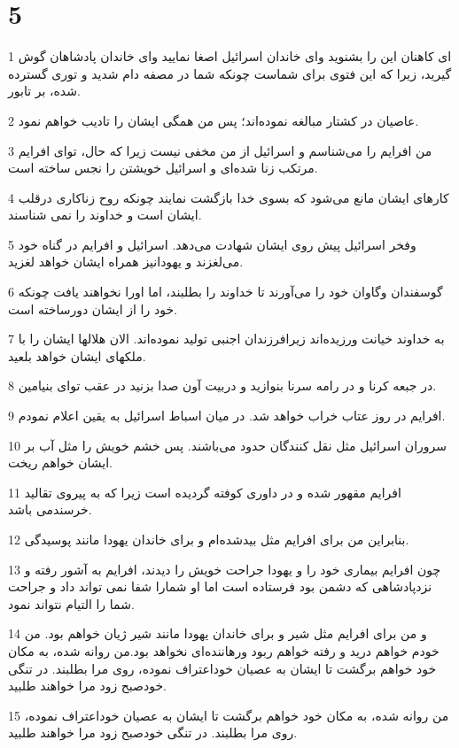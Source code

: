 \chapter{5}

\par 1 ای کاهنان این را بشنوید و‌ای خاندان اسرائیل اصغا نمایید و‌ای خاندان پادشاهان گوش گیرید، زیرا که این فتوی برای شماست چونکه شما در مصفه دام شدید و توری گسترده شده، بر تابور.
\par 2 عاصیان در کشتار مبالغه نموده‌اند؛ پس من همگی ایشان را تادیب خواهم نمود.
\par 3 من افرایم را می‌شناسم و اسرائیل از من مخفی نیست زیرا که حال، تو‌ای افرایم مرتکب زنا شده‌ای و اسرائیل خویشتن را نجس ساخته است.
\par 4 کارهای ایشان مانع می‌شود که بسوی خدا بازگشت نمایند چونکه روح زناکاری درقلب ایشان است و خداوند را نمی شناسند.
\par 5 وفخر اسرائیل پیش روی ایشان شهادت می‌دهد. اسرائیل و افرایم در گناه خود می‌لغزند و یهودانیز همراه ایشان خواهد لغزید.
\par 6 گوسفندان وگاوان خود را می‌آورند تا خداوند را بطلبند، اما اورا نخواهند یافت چونکه خود را از ایشان دورساخته است.
\par 7 به خداوند خیانت ورزیده‌اند زیرافرزندان اجنبی تولید نموده‌اند. الان هلالها ایشان را با ملکهای ایشان خواهد بلعید.
\par 8 در جبعه کرنا و در رامه سرنا بنوازید و دربیت آون صدا بزنید در عقب تو‌ای بنیامین.
\par 9 افرایم در روز عتاب خراب خواهد شد. در میان اسباط اسرائیل به یقین اعلام نمودم.
\par 10 سروران اسرائیل مثل نقل کنندگان حدود می‌باشند. پس خشم خویش را مثل آب بر ایشان خواهم ریخت.
\par 11 افرایم مقهور شده و در داوری کوفته گردیده است زیرا که به پیروی تقالید خرسندمی باشد.
\par 12 بنابراین من برای افرایم مثل بیدشده‌ام و برای خاندان یهودا مانند پوسیدگی.
\par 13 چون افرایم بیماری خود را و یهودا جراحت خویش را دیدند، افرایم به آشور رفته و نزدپادشاهی که دشمن بود فرستاده است اما او شمارا شفا نمی تواند داد و جراحت شما را التیام نتواند نمود.
\par 14 و من برای افرایم مثل شیر و برای خاندان یهودا مانند شیر ژیان خواهم بود. من خودم خواهم درید و رفته خواهم ربود ورهاننده‌ای نخواهد بود.من روانه شده، به مکان خود خواهم برگشت تا ایشان به عصیان خوداعتراف نموده، روی مرا بطلبند. در تنگی خودصبح زود مرا خواهند طلبید.
\par 15 من روانه شده، به مکان خود خواهم برگشت تا ایشان به عصیان خوداعتراف نموده، روی مرا بطلبند. در تنگی خودصبح زود مرا خواهند طلبید.

